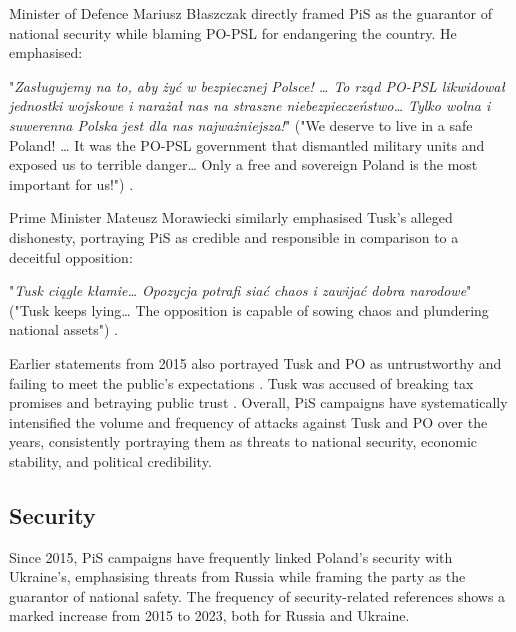 Minister of Defence Mariusz Błaszczak directly framed PiS as the guarantor of national security while blaming PO-PSL for endangering the country. He emphasised:

\begin{displayquote}
    "\textit{Zasługujemy na to, aby żyć w bezpiecznej Polsce! … To rząd PO-PSL likwidował jednostki wojskowe i narażał nas na straszne niebezpieczeństwo… Tylko wolna i suwerenna Polska jest dla nas najważniejsza!}" ("We deserve to live in a safe Poland! … It was the PO-PSL government that dismantled military units and exposed us to terrible danger… Only a free and sovereign Poland is the most important for us!") \citep{pisorgpl2023e}.
\end{displayquote}

Prime Minister Mateusz Morawiecki similarly emphasised Tusk's alleged dishonesty, portraying PiS as credible and responsible in comparison to a deceitful opposition:

\begin{displayquote}
    "\textit{Tusk ciągle kłamie… Opozycja potrafi siać chaos i zawijać dobra narodowe}" ("Tusk keeps lying… The opposition is capable of sowing chaos and plundering national assets") \citep{pisorgpl2023f}.
\end{displayquote}

Earlier statements from 2015 also portrayed Tusk and PO as untrustworthy and failing to meet the public's expectations \citep{pisorgpl2015c}. Tusk was accused of breaking tax promises and betraying public trust \citep{pisorgpl2015d}. Overall, PiS campaigns have systematically intensified the volume and frequency of attacks against Tusk and PO over the years, consistently portraying them as threats to national security, economic stability, and political credibility.

\pagebreak

\subsection{Security}

Since 2015, PiS campaigns have frequently linked Poland's security with Ukraine's, emphasising threats from Russia while framing the party as the guarantor of national safety. The frequency of security-related references shows a marked increase from 2015 to 2023, both for Russia and Ukraine. \\

\vspace{1cm}

